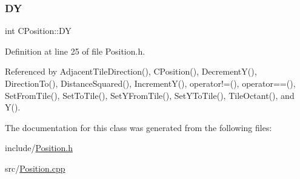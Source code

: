 \subsubsection{\texorpdfstring{DY}{DY}}
{\footnotesize\ttfamily int C\+Position\+::\+DY\hspace{0.3cm}{\ttfamily [protected]}}



Definition at line 25 of file Position.\+h.



Referenced by Adjacent\+Tile\+Direction(), C\+Position(), Decrement\+Y(), Direction\+To(), Distance\+Squared(), Increment\+Y(), operator!=(), operator==(), Set\+From\+Tile(), Set\+To\+Tile(), Set\+Y\+From\+Tile(), Set\+Y\+To\+Tile(), Tile\+Octant(), and Y().



The documentation for this class was generated from the following files\+:\begin{DoxyCompactItemize}
\item 
include/\hyperlink{Position_8h}{Position.\+h}\item 
src/\hyperlink{Position_8cpp}{Position.\+cpp}\end{DoxyCompactItemize}
